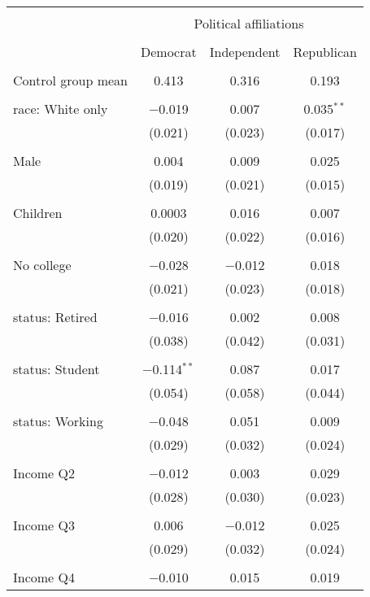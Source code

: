 
\begin{tabular}{@{\extracolsep{5pt}}lccc} 
\\[-1.8ex]\hline 
\hline \\[-1.8ex] 
 & \multicolumn{3}{c}{Political affiliations} \\ 
\cline{2-4} 
\\[-1.8ex] & Democrat & Independent & Republican \\ 
\hline \\[-1.8ex] 
 Control group mean & 0.413 & 0.316 & 0.193  \\ \hline \\[-1.8ex] race: White only & $-$0.019 & 0.007 & 0.035$^{**}$ \\ 
  & (0.021) & (0.023) & (0.017) \\ 
  & & & \\ 
 Male & 0.004 & 0.009 & 0.025 \\ 
  & (0.019) & (0.021) & (0.015) \\ 
  & & & \\ 
 Children & 0.0003 & 0.016 & 0.007 \\ 
  & (0.020) & (0.022) & (0.016) \\ 
  & & & \\ 
 No college & $-$0.028 & $-$0.012 & 0.018 \\ 
  & (0.021) & (0.023) & (0.018) \\ 
  & & & \\ 
 status: Retired & $-$0.016 & 0.002 & 0.008 \\ 
  & (0.038) & (0.042) & (0.031) \\ 
  & & & \\ 
 status: Student & $-$0.114$^{**}$ & 0.087 & 0.017 \\ 
  & (0.054) & (0.058) & (0.044) \\ 
  & & & \\ 
 status: Working & $-$0.048 & 0.051 & 0.009 \\ 
  & (0.029) & (0.032) & (0.024) \\ 
  & & & \\ 
 Income Q2 & $-$0.012 & 0.003 & 0.029 \\ 
  & (0.028) & (0.030) & (0.023) \\ 
  & & & \\ 
 Income Q3 & 0.006 & $-$0.012 & 0.025 \\ 
  & (0.029) & (0.032) & (0.024) \\ 
  & & & \\ 
 Income Q4 & $-$0.010 & 0.015 & 0.019 \\ 

\end{tabular}
